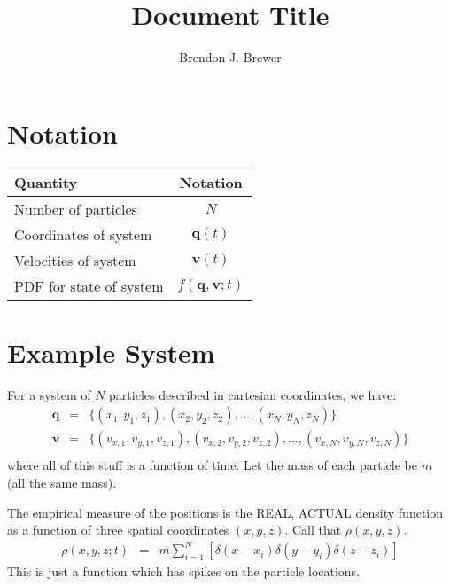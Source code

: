 \documentclass[a4paper, 11pt]{article}
\title{Document Title}
\author{Brendon J. Brewer}
\begin{document}
\maketitle

\section{Notation}

\begin{table}[h!]
\begin{center}
\begin{tabular}{|l|c|}
\hline
{\bf Quantity} & {\bf Notation}\\
\hline
Number of particles & $N$\\
Coordinates of system & $\mathbf{q}(t)$\\
Velocities of system  & $\mathbf{v}(t)$\\
PDF for state of system & $f(\mathbf{q}, \mathbf{v}; t)$\\
\hline
\end{tabular}
\end{center}
\end{table}

\section{Example System}

For a system of $N$ particles described in cartesian coordinates, we have:
\begin{eqnarray}
\mathbf{q} &=& \{(x_1, y_1, z_1), (x_2, y_2, z_2), ..., (x_N, y_N, z_N)\}\\
\mathbf{v} &=& \{(v_{x,1}, v_{y,1}, v_{z,1}), (v_{x,2}, v_{y,2}, v_{z,2}), ..., (v_{x,N}, v_{y,N}, v_{z,N})\}\\
\end{eqnarray}
where all of this stuff is a function of time. Let the mass of each particle be
$m$ (all the same mass).

The empirical measure of the positions is the REAL, ACTUAL density function
as a function of three spatial coordinates $(x, y, z)$. Call that $\rho(x,y,z)$.
\begin{eqnarray}
\rho(x, y, z; t) &=& m \sum_{i=1}^N\left[
\delta(x - x_i)\delta(y - y_i)\delta(z - z_i)
\right]
\end{eqnarray}
This is just a function which has spikes on the particle locations.
\end{document}
